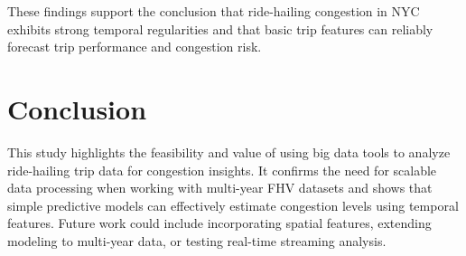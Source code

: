 \documentclass{article}
\begin{document}
These findings support the conclusion that ride-hailing congestion in NYC exhibits strong temporal regularities and that basic trip features can reliably forecast trip performance and congestion risk.

\section{Conclusion}
This study highlights the feasibility and value of using big data tools to analyze ride-hailing trip data for congestion insights. It confirms the need for scalable data processing when working with multi-year FHV datasets and shows that simple predictive models can effectively estimate congestion levels using temporal features. Future work could include incorporating spatial features, extending modeling to multi-year data, or testing real-time streaming analysis.



\end{document}

